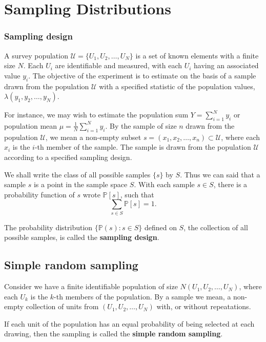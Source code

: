 \chapter{Sampling Distributions}

\subsection{Sampling design}

A survey population $\mathcal{U} = \{U_1, U_2, \ldots, U_N\}$ is a set of known 
elements with a finite size $N$. Each $U_i$ 
are identifiable and measured, with each $U_i$ having 
an associated value $y_i$. The objective of the experiment
is to estimate on the basis of a sample drawn from the population $\mathcal{U}$
with a specified statistic of the population values, $\lambda(y_1, y_2, \ldots, y_N)$.

For instance, we may wish to estimate the population 
sum $Y = \sum_{i=1}^N y_i$ or population mean $\mu = \frac{1}{N} \sum_{i=1}^N y_i$.
By the sample of size $n$ drawn from the population $\mathcal{U}$, we mean 
a non-empty subset $s = (x_1, x_2, \ldots, x_n) \subset \mathcal{U}$, where 
each $x_i$ is the $i$-th member of the sample. The sample is drawn from the population $\mathcal{U}$ according to a specified sampling design.

We shall write the class of all possible samples $\{ s \}$ by $S$. Thus 
we can said that a sample $s$ is a point in the sample space $S$. 
With each sample $s \in S$, there 
is a probability function of $s$ wrote $\mathbb{P}[s]$, such that 
\begin{equation}
    \sum_{s \in S} \mathbb{P}[s] = 1.
\end{equation}

The probability distribution $\{ \mathbb{P}(s) : s \in S \}$ defined 
on $S$, the collection of all possible samples, is called the \textbf{sampling design}.

\section{Simple random sampling}
Consider we have a finite identifiable population of size 
$N(U_1, U_2, \ldots, U_N)$, where each $U_k$ is the $k$-th 
members of the population. By a sample we mean, 
a non-empty collection of units from $(U_1, U_2, \ldots, U_N)$ with, 
or without repeatations.

\begin{definition}
    If each unit of the population has an equal probability 
    of being selected at each drawing, then the sampling is called
    the \textbf{simple random sampling}.
\end{definition}

